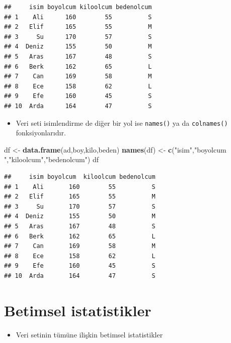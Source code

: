 \documentclass[
  oneside]{book}
\newenvironment{Shaded}{\begin{snugshade}}{\end{snugshade}}
\newcommand{\FunctionTok}[1]{\textcolor[rgb]{0.13,0.29,0.53}{\textbf{#1}}}
\newcommand{\NormalTok}[1]{#1}
\newcommand{\OtherTok}[1]{\textcolor[rgb]{0.56,0.35,0.01}{#1}}
\newcommand{\StringTok}[1]{\textcolor[rgb]{0.31,0.60,0.02}{#1}}
\providecommand{\tightlist}{%
  \setlength{\itemsep}{0pt}\setlength{\parskip}{0pt}}
\begin{document}
\begin{verbatim}
##     isim boyolcum kiloolcum bedenolcum
## 1    Ali      160        55          S
## 2   Elif      165        55          M
## 3     Su      170        57          S
## 4  Deniz      155        50          M
## 5   Aras      167        48          S
## 6   Berk      162        65          L
## 7    Can      169        58          M
## 8    Ece      158        62          L
## 9    Efe      160        45          S
## 10  Arda      164        47          S
\end{verbatim}

\begin{itemize}
\tightlist
\item
  Veri seti isimlendirme de diğer bir yol ise \texttt{names()} ya da \texttt{colnames()} fonksiyonlarıdır.
\end{itemize}

\begin{Shaded}
\begin{Highlighting}[]
\NormalTok{df }\OtherTok{\textless{}{-}} \FunctionTok{data.frame}\NormalTok{(ad,boy,kilo,beden)}
\FunctionTok{names}\NormalTok{(df) }\OtherTok{\textless{}{-}} \FunctionTok{c}\NormalTok{(}\StringTok{"isim"}\NormalTok{,}\StringTok{"boyolcum "}\NormalTok{,}\StringTok{"kiloolcum"}\NormalTok{,}\StringTok{"bedenolcum"}\NormalTok{)}
\NormalTok{df}
\end{Highlighting}
\end{Shaded}

\begin{verbatim}
##     isim boyolcum  kiloolcum bedenolcum
## 1    Ali       160        55          S
## 2   Elif       165        55          M
## 3     Su       170        57          S
## 4  Deniz       155        50          M
## 5   Aras       167        48          S
## 6   Berk       162        65          L
## 7    Can       169        58          M
## 8    Ece       158        62          L
## 9    Efe       160        45          S
## 10  Arda       164        47          S
\end{verbatim}

\hypertarget{betimsel-istatistikler}{%
\section{Betimsel istatistikler}\label{betimsel-istatistikler}}

\begin{itemize}
\tightlist
\item
  Veri setinin tümüne ilişkin betimsel istatistikler
\end{itemize}
\end{document}
